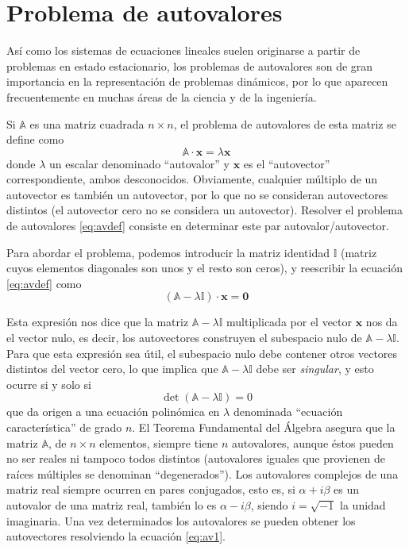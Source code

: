 

\section{Problema de autovalores}

Así como los sistemas de ecuaciones lineales suelen originarse a partir de problemas en estado estacionario, los problemas de autovalores son de gran importancia en la representación de problemas dinámicos, por lo que aparecen frecuentemente en muchas áreas de la ciencia y de la ingeniería.

Si $\mathbb{A}$ es una matriz cuadrada $n \times n$, el problema de autovalores de esta matriz se define como
\begin{equation}\label{eq:avdef}
 \mathbb{A} \cdot \bm{x} = \lambda \bm{x}
\end{equation} 
donde $\lambda$ un escalar denominado ``autovalor'' y $\bm{x}$ es el ``autovector'' correspondiente, ambos desconocidos. Obviamente, cualquier múltiplo de un autovector es también un autovector, por lo que no se consideran autovectores distintos (el autovector cero no se considera un autovector). Resolver el problema de autovalores \eqref{eq:avdef} consiste en determinar este par autovalor/autovector.

Para abordar el problema, podemos introducir la matriz identidad $\mathbb{I}$ (matriz cuyos elementos diagonales son unos y el resto son ceros), y reescribir la ecuación \eqref{eq:avdef} como
\begin{equation}\label{eq:av1}
 (\mathbb{A} - \lambda \mathbb{I}) \cdot \bm{x} = \bm{0}
\end{equation} 

Esta expresión nos dice que la matriz $\mathbb{A} - \lambda \mathbb{I}$ multiplicada por el vector $\bm{x}$ nos da el vector nulo, es decir, los autovectores construyen el subespacio nulo de $\mathbb{A} - \lambda \mathbb{I}$. Para que esta expresión sea útil, el subespacio nulo debe contener otros vectores distintos del vector cero, lo que implica que $\mathbb{A} - \lambda \mathbb{I}$ debe ser \textit{singular}, y esto ocurre si y solo si
\begin{equation}\label{eq:avcaract}
 \det(\mathbb{A} - \lambda \mathbb{I}) = 0
\end{equation} 
que da origen a una ecuación polinómica en $\lambda$ denominada ``ecuación característica'' de grado $n$. El Teorema Fundamental del Álgebra asegura que la matriz $\mathbb{A}$, de $n \times n$ elementos, siempre tiene $n$ autovalores, aunque éstos pueden no ser reales ni tampoco todos distintos (autovalores iguales que provienen de raíces múltiples se denominan ``degenerados''). Los autovalores complejos de una matriz real siempre ocurren en pares conjugados, esto es, si $\alpha + i \beta$ es un autovalor de una matriz real, también lo es $\alpha - i \beta$, siendo $i = \sqrt{-1}$ la unidad imaginaria. Una vez determinados los autovalores se pueden obtener los autovectores resolviendo la ecuación \eqref{eq:av1}.

